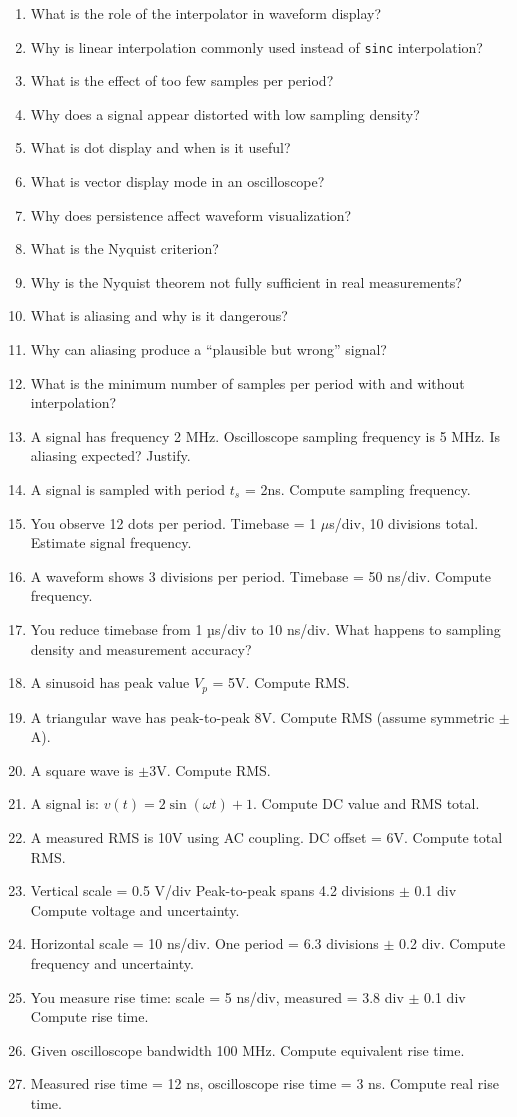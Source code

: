 \documentclass[../main.tex]{subfiles}
\begin{document}
\begin{enumerate}[label=\textbf{\arabic*.}]
	\item What is the role of the interpolator in waveform display?
	\item Why is linear interpolation commonly used instead of \texttt{sinc} interpolation?
	\item What is the effect of too few samples per period?
	\item Why does a signal appear distorted with low sampling density?
	\item What is dot display and when is it useful?
	\item What is vector display mode in an oscilloscope?
	\item Why does persistence affect waveform visualization?
	\item What is the Nyquist criterion?
	\item Why is the Nyquist theorem not fully sufficient in real measurements?
	\item What is aliasing and why is it dangerous?
	\item Why can aliasing produce a “plausible but wrong” signal?
	\item What is the minimum number of samples per period with and without interpolation?
	\item A signal has frequency 2 MHz. Oscilloscope sampling frequency is 5 MHz. Is aliasing expected? Justify.
	\item A signal is sampled with period $t_s$ = 2ns. Compute sampling frequency.
	\item You observe 12 dots per period. Timebase = 1 $\mu$s/div, 10 divisions total. Estimate signal frequency.
	\item A waveform shows 3 divisions per period. Timebase = 50 ns/div. Compute frequency.
	\item You reduce timebase from 1 µs/div to 10 ns/div. What happens to sampling density and measurement accuracy?
	\item A sinusoid has peak value $V_p$ = 5V. Compute RMS.
	\item A triangular wave has peak-to-peak 8V. Compute RMS (assume symmetric $\pm$A).
	\item A square wave is $\pm$3V. Compute RMS.
	\item A signal is: $v(t) = 2\sin(\omega t) + 1$. Compute DC value and RMS total.
	\item A measured RMS is 10V using AC coupling. DC offset = 6V. Compute total RMS.
	\item Vertical scale = 0.5 V/div Peak-to-peak spans 4.2 divisions $\pm$ 0.1 div Compute voltage and uncertainty.
	\item Horizontal scale = 10 ns/div. One period = 6.3 divisions $\pm$ 0.2 div. Compute frequency and uncertainty.
	\item You measure rise time: scale = 5 ns/div, measured = 3.8 div $\pm$ 0.1 div Compute rise time.
	\item Given oscilloscope bandwidth 100 MHz. Compute equivalent rise time.
	\item Measured rise time = 12 ns, oscilloscope rise time = 3 ns. Compute real rise time.
\end{enumerate}
\end{document}
